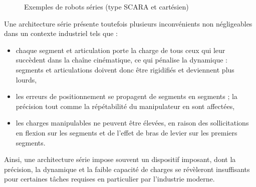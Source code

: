 \begin{figure}[!ht]
  \centering
\hfill
    \caption{\footnotesize{Exemples de robots séries (type SCARA et 
cart\'esien)}}
\label{intro:fig2}
\end{figure}

Une architecture série présente toutefois plusieurs inconvénients non 
négli\-gea\-bles dans un contexte industriel tels que :
\begin{itemize}
 \item chaque segment et articulation porte la charge de tous ceux qui leur 
succèdent dans la chaîne cinématique, ce qui pénalise la dynamique : segments 
et 
articulations doivent donc être rigidifiés et deviennent plus lourds, 
 \item les erreurs de positionnement se propagent de segments en segments ; la 
précision tout comme la répétabilité du manipulateur en sont affectées,
 \item les charges manipulables ne peuvent être \'elev\'ees, en raison des 
sollicitations en flexion sur les segments et de l'effet de bras de levier sur 
les premiers segments.
\end{itemize}

Ainsi, une architecture série impose souvent un dispositif imposant, dont la 
précision, la dynamique et la faible capacité de charges se révèleront 
insuffisants pour certaines tâches requises en particulier par l'industrie 
moderne.

